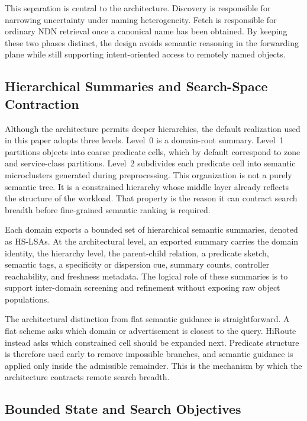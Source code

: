 \documentclass[journal]{IEEEtran}
\newcommand{\sysname}{HiRoute}
\newcommand{\hslsa}{HS-LSA}
\begin{document}
This separation is central to the architecture. Discovery is responsible for narrowing uncertainty under naming heterogeneity. Fetch is responsible for ordinary NDN retrieval once a canonical name has been obtained. By keeping these two phases distinct, the design avoids semantic reasoning in the forwarding plane while still supporting intent-oriented access to remotely named objects.

\subsection{Hierarchical Summaries and Search-Space Contraction}

Although the architecture permits deeper hierarchies, the default realization used in this paper adopts three levels. Level~0 is a domain-root summary. Level~1 partitions objects into coarse predicate cells, which by default correspond to zone and service-class partitions. Level~2 subdivides each predicate cell into semantic microclusters generated during preprocessing. This organization is not a purely semantic tree. It is a constrained hierarchy whose middle layer already reflects the structure of the workload. That property is the reason it can contract search breadth before fine-grained semantic ranking is required.

Each domain exports a bounded set of hierarchical semantic summaries, denoted as \hslsa{}s. At the architectural level, an exported summary carries the domain identity, the hierarchy level, the parent-child relation, a predicate sketch, semantic tags, a specificity or dispersion cue, summary counts, controller reachability, and freshness metadata. The logical role of these summaries is to support inter-domain screening and refinement without exposing raw object populations.

The architectural distinction from flat semantic guidance is straightforward. A flat scheme asks which domain or advertisement is closest to the query. \sysname{} instead asks which constrained cell should be expanded next. Predicate structure is therefore used early to remove impossible branches, and semantic guidance is applied only inside the admissible remainder. This is the mechanism by which the architecture contracts remote search breadth.

\subsection{Bounded State and Search Objectives}
\end{document}

